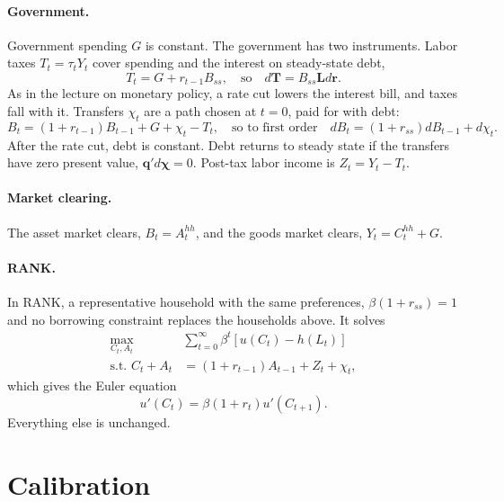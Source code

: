 \paragraph*{Government.}
Government spending $G$ is constant. The government has two instruments. Labor taxes $T_{t}=\tau_{t}Y_{t}$ cover spending and the interest on steady-state debt,
\begin{equation}
T_{t}=G+r_{t-1}B_{ss},\quad\text{so}\quad d\boldsymbol{T}=B_{ss}\boldsymbol{L}d\boldsymbol{r}.\label{eq:taxes}
\end{equation}
As in the lecture on monetary policy, a rate cut lowers the interest bill, and taxes fall with it. Transfers $\chi_{t}$ are a path chosen at $t=0$, paid for with debt:
\begin{equation}
B_{t}=(1+r_{t-1})B_{t-1}+G+\chi_{t}-T_{t},\quad\text{so to first order}\quad dB_{t}=(1+r_{ss})dB_{t-1}+d\chi_{t}.\label{eq:gov}
\end{equation}
After the rate cut, debt is constant. Debt returns to steady state if the transfers have zero present value, $\boldsymbol{q}'d\boldsymbol{\chi}=0$. Post-tax labor income is $Z_{t}=Y_{t}-T_{t}$.

\paragraph*{Market clearing.}
The asset market clears, $B_{t}=A^{hh}_{t}$, and the goods market clears, $Y_{t}=C^{hh}_{t}+G$.

\paragraph*{RANK.}
In RANK, a representative household with the same preferences, $\beta(1+r_{ss})=1$ and no borrowing constraint replaces the households above. It solves
\begin{align*}
\max_{C_{t},A_{t}} & \sum_{t=0}^{\infty}\beta^{t}\left[u\left(C_{t}\right)-h\left(L_{t}\right)\right]\\
\text{s.t. }C_{t}+A_{t} & =\left(1+r_{t-1}\right)A_{t-1}+Z_{t}+\chi_{t},
\end{align*}
which gives the Euler equation
\begin{equation}
u'\left(C_{t}\right)=\beta\left(1+r_{t}\right)u'\left(C_{t+1}\right).\label{eq:euler}
\end{equation}
Everything else is unchanged.

\section{Calibration}


